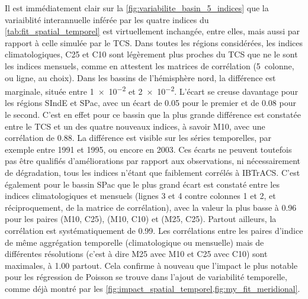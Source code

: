 \documentclass[../main.tex]{subfiles}
\begin{document}
Il est immédiatement clair sur la \cref{fig:variabilite_basin_5_indices} que la variaiblité interannuelle inférée par les quatre indices du
\cref{tab:fit_spatial_temporel} est virtuellement inchangée, entre elles, mais aussi par rapport à celle simulée par le TCS. Dans toutes les régions
considérées, les indices climatologiques, C25 et C10 sont légèrement plus proches du TCS que ne le sont les indices mensuels, comme en attestent les matrices de
corrélation (5\ieme~colonne, ou ligne, au choix). Dans les bassins de l'hémisphère nord, la différence est marginale, située entre \num{1e-2} et \num{2e-2}.
L'écart se creuse davantage pour les régions SIndE et SPac, avec un écart de \num{0.05} pour le premier et de \num{0.08} pour le second. C'est en effet pour ce
bassin que la plus grande différence est constatée entre le TCS et un des quatre nouveaux indices, à savoir M10, avec une corrélation de \num{0.88}. La
différence est visible sur les séries temporelles, par exemple entre \num{1991} et \num{1995}, ou encore en \num{2003}. Ces écarts ne peuvent toutefois pas être
qualifiés d'améliorations par rapport aux observations, ni nécessairement de dégradation, tous les indices n'étant que faiblement corrélés à IBTrACS. C'est
également pour le bassin SPac que le plus grand écart est constaté entre les indices climatologiques et mensuels (lignes 3 et 4 contre colonnes 1 et 2, et
réciproquement, de la matrice de corrélation), avec la valeur la plus basse à \num{0.96} pour les paires (M10, C25), (M10, C10) et (M25, C25). Partout ailleurs,
la corrélation est systématiquement de \num{0.99}. Les corrélations entre les paires d'indice de même aggrégation temporelle (climatologique ou mensuelle) mais
de différentes résolutions (c'est à dire M25 avec M10 et C25 avec C10) sont maximales, à \num{1.00} partout. Cela confirme à nouveau que l'impact le plus
notable pour les régression de Poisson se trouve dans l'ajout de variabilité temporelle, comme déjà montré par les
\cref{fig:impact_spatial_temporel,fig:my_fit_meridional}.
\end{document}
